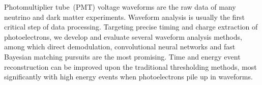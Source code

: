 Photomultiplier tube~(PMT) voltage waveforms are the raw data of many neutrino and dark matter experiments.  Waveform analysis is usually the first critical step of data processing.  Targeting precise timing and charge extraction of photoelectrons, we develop and evaluate several waveform analysis methods, among which direct demodulation, convolutional neural networks and fast Bayesian matching pursuits are the most promising. Time and energy event reconstruction can be improved upon the traditional thresholding methods, most significantly with high energy events when photoelectrons pile up in waveforms. 